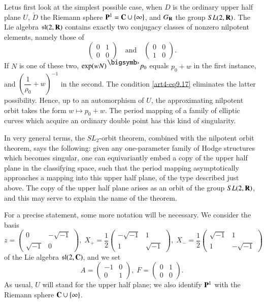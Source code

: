 Let\pageoriginale us first look at the simplest possible case, when $D$ is the ordinary upper half plane $U$, $\check{D}$ the Riemann sphere $\mathbf{P}^1 = \mathbf{C} \cup \{\infty\}$, and $G_{\mathbf{R}}$ the group $SL (2, \mathbf{R})$. The Lie algebra $\mathfrak{s}\mathfrak{l} (2, \mathbf{R})$ contains exactly two conjugacy classes of nonzero nilpotent elements, namely those of
$$
\begin{pmatrix}
0 & 1 \\
0 & 0
\end{pmatrix} \text{~~ and ~~} 
\begin{pmatrix}
0&0\\
1&0
\end{pmatrix}.
$$
If $N$ is one of these two, $\exp (w N)^\bigdot p_0$ equals $p_0 + w$ in the first instance, and $\left(\dfrac{1}{\rho_0} + w \right)^{-1}$ in the second. The condition \eqref{art4-eq9.17} eliminates the latter possibility. Hence, up to an automorphism of $U$, the approximating nilpotent orbit takes the form $w \longmapsto p_0 +w$. The period mapping of a family of elliptic curves which acquire an ordinary double point has this kind of singularity.

In very general terms, the $SL_2$-orbit theorem, combined with the nilpotent orbit theorem, says the following: given any one-parameter family of Hodge structures which becomes singular, one can equivariantly embed a copy of the upper half plane in the classifying space, such that the period mapping asymptotically approaches a mapping into this upper half plane, of the type described just above. The copy of the upper half plane arises as an orbit of the group $SL (2, \mathbf{R})$, and this may serve to explain the name of the theorem.

For a precise statement, some more notation will be necessary. We consider the basis
\begin{equation}
z = \begin{pmatrix}
0 & -\sqrt{-1}\\
\sqrt{-1} & 0 
\end{pmatrix}, \; X_+ = \frac{1}{2} 
\begin{pmatrix}
-\sqrt{-1} & 1 \\
1 & \sqrt{-1}
\end{pmatrix}, \; X _- = \frac{1}{2} 
\begin{pmatrix}
\sqrt{-1} & 1 \\
1 & - \sqrt{-1}
\end{pmatrix}
\label{art4-eq9.18}
\end{equation}
of the Lie algebra $\mathfrak{s} \mathfrak{l}(2, \mathbf{C})$, and we set
$$
 A = 
\begin{pmatrix}
-1 & 0\\
0 & 1
\end{pmatrix}, \; F = 
\begin{pmatrix}
0 & 1\\
0 & 0
\end{pmatrix}.
$$
As usual, $U$ will stand for the upper half plane; we also identify $\mathbf{P}^1$ with the Riemann sphere $\mathbf{C} \cup \{\infty\}$.

